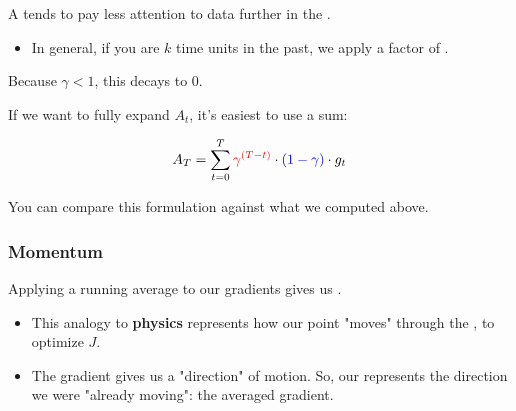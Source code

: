             \begin{concept}
                A  tends to pay less attention to data further in the .

                \begin{itemize}
                    \item In general, if you are $k$ time units in the past, we apply a factor of .
                \end{itemize}

                Because $\gamma<1$, this  decays to 0.

                \phantom{}

                If we want to fully expand $A_t$, it's easiest to use a sum:

                \begin{equation*}
                    A_T = \sum_{t=0}^T \textcolor{red}{\gamma^{(T-t)}} \cdot \textcolor{blue}{(1-\gamma)} \cdot g_t
                \end{equation*}
            \end{concept}
            You can compare this formulation against what we computed above.

            \phantom{}
            

        \subsubsection{Momentum}

            Applying a running average to our gradients gives us .

            \begin{itemize}
                \item This analogy to \textbf{physics} represents how our point "moves" through the , to optimize $J$.
                    
                \item The gradient gives us a "direction" of motion. So, our  represents the direction we were "already moving": the  averaged gradient.
            \end{itemize}

